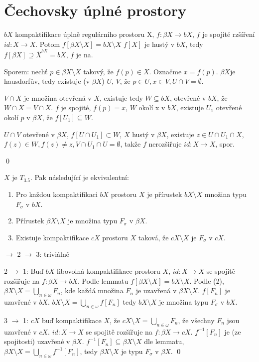 \documentclass[12pt,a4paper]{article}
\newcommand\BX{\ensuremath{\beta X}}
\newcommand\Tich{$T_{3.5}$}
\newcommand\close{\overline}
\begin{document}
\section{Čechovsky úplné prostory}
\lemma
	$bX$ kompaktifikace úplně regulárního prostoru X, $f: \beta X \to
	bX$, $f$ je spojité rzšíření $id: X \to X$. Potom $f[\beta
	X\setminus X] = bX \setminus X$
\dukaz
	$f[X]$ je hustý v $bX$, tedy $f[\beta X] \supseteq \close X^{bX} = bX$,
	$f$ je na.

	Sporem: nechť $p \in \beta X \setminus X$ takový, že $f(p) \in
	X$. Označme $x = f(p)$. \BX je hausdorfův, tedy existuje (v \BX) $U$, $V$,
	že $p \in U, x \in V, U \cap V = \emptyset$.

	$V \cap X$ je množina otevřená v $X$, existuje tedy $W \subseteq bX$,
	otevřené v $bX$, že $W \cap X = V \cap X$. $f$ je spojité, $f(p) = x$, $W$
	okolí x v $bX$, existuje $U_1$ otevřené okolí $p$ v $\beta X$, že $f[U_1]
	\subseteq W$.
	
	$U \cap V$ otevřené v \BX, $f[U \cap U_1] \subset W$, $X$ hustý v
	$\beta X$, existuje $z \in U \cap U_1 \cap X$, $f(z) \in W, f(z) \neq z,
	V \cap U_1 \cap U = \emptyset$, takže $f$ nerozšiřuje $id: X \to
	X$, spor.

	\qed

\veta $X$ je \Tich. Pak následující je ekvivalentní:
\begin{enumerate}
	\item Pro každou kompaktifikaci $bX$ prostoru $X$ je přírustek $bX
		\setminus X$ množina typu $F_\sigma$ v $bX$.
	\item Přírustek $\beta X \setminus X$ je množina typu $F_\sigma$ v \BX.
	\item Existuje kompaktifikace $cX$ prostoru $X$ taková, že $cX \setminus X$
		je $F_\sigma$ v $cX$.
\end{enumerate}

 $\rightarrow$ 2 $\rightarrow$ 3: triviálně

2 $\rightarrow$ 1: Buď $bX$ libovolná kompaktifikace prostoru $X$, $id: X \to
	X$ se spojitě rozšiřuje na $f : \beta X \to bX$. Podle lemmatu $f[\BX
	\setminus X] = bX \setminus X$. Podle (2), $\BX \setminus X = \bigcup_{n
	\in \omega} F_n$, kde každá množina $F_n$ je uzavřená v $\BX \setminus X$.
	$f[F_n]$ je uzavřené v $bX$. $bX \setminus X = \bigcup_{n \in \omega}
	f[F_n]$ tedy $bX \setminus X$ je množina typu $F_\sigma$ v $bX$.

3 $\rightarrow$ 1: $cX$ buď kompaktifikace $X$, že $cX \setminus X = \bigcup_{n
	\in \omega} F_n$, že všechny $F_n$ jsou uzavřené v $cX$. $id : X \to X$ se
	spojitě rozšířuje na $f : \BX \to cX$. $f^{-1}[F_n]$ je (ze spojitosti)
	uzavřené v \BX. $f^{-1}[F_n] \subseteq \beta X \setminus X$ dle lemmatu,
	$\BX \setminus X = \bigcup_{n \in \omega} f^{-1}[F_n]$, tedy $\beta X
	\setminus X$ je typu $F_\sigma$ v \BX.
\qed
\end{document}
